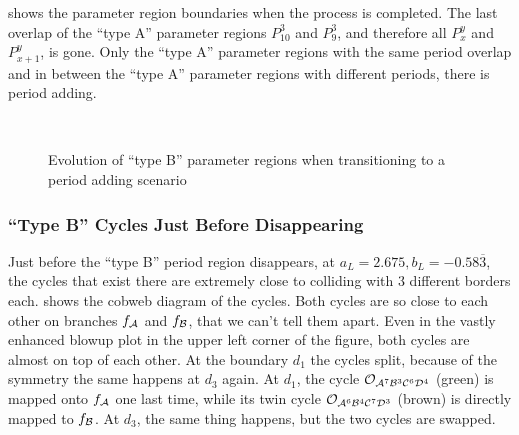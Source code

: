  shows the parameter region boundaries when the process is completed.
The last overlap of the ``type A'' parameter regions $P_{10}^3$ and $P_{9}^3$, and therefore all $P_x^y$ and $P_{x+1}^y$, is gone.
Only the ``type A'' parameter regions with the same period overlap and in between the ``type A'' parameter regions with different periods, there is period adding.


\begin{figure}
    \centering
     \\
    \caption{Evolution of ``type B'' parameter regions when transitioning to a period adding scenario}
    \label{fig:minrep.path.to.disappearance}
\end{figure}

\subsubsection{``Type B'' Cycles Just Before Disappearing}

Just before the ``type B'' period region disappears, at $a_L = 2.675, b_L = -0.58\overline{3}$, the cycles that exist there are extremely close to colliding with 3 different borders each.
 shows the cobweb diagram of the cycles.
Both cycles are so close to each other on branches $f_{\mathcal{A}}$ and $f_{\mathcal{B}}$, that we can't tell them apart.
Even in the vastly enhanced blowup plot in the upper left corner of the figure, both cycles are almost on top of each other.
At the boundary $d_1$ the cycles split, because of the symmetry the same happens at $d_3$ again.
At $d_1$, the cycle $\mathcal{O}_{\mathcal{A}^7\mathcal{B}^3\mathcal{C}^6\mathcal{D}^4}$ (green) is mapped onto $f_{\mathcal{A}}$ one last time, while its twin cycle $\mathcal{O}_{\mathcal{A}^6\mathcal{B}^4\mathcal{C}^7\mathcal{D}^3}$ (brown) is directly mapped to $f_{\mathcal{B}}$.
At $d_3$, the same thing happens, but the two cycles are swapped.

